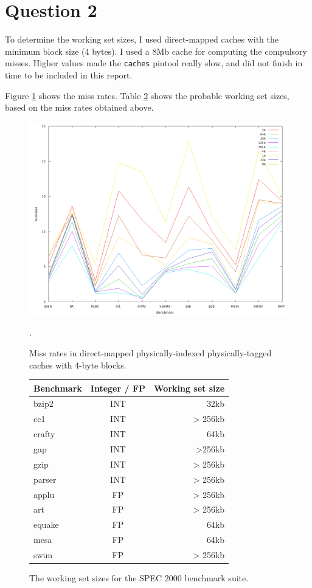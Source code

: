 \section{Question 2}
To determine the working set sizes, I used direct-mapped caches with the
minimum block size (4 bytes). I used a 8Mb cache for computing the compulsory
misses. Higher values made the \texttt{caches} pintool really slow, and did not
finish in time to be included in this report.

Figure \ref{q2:miss_rates} shows the miss rates. Table \ref{q2:working_set}
shows the probable working set sizes, based on the miss rates obtained above.

\begin{figure}[htb]
  \includegraphics[width=6.8in]{6.823/lab2/figs/working_set.png}
  \caption{Miss rates in direct-mapped physically-indexed physically-tagged
  caches with 4-byte blocks. }
  \label{q2:miss_rates}.
\end{figure}

\begin{figure}[htb]
\center

\begin{tabular}{lcr}
\hline
Benchmark & Integer / FP & Working set size \\
\hline
bzip2 & INT & 32kb \\
cc1 & INT & > 256kb \\
crafty & INT & 64kb \\
gap & INT & >256kb \\
gzip & INT & > 256kb \\
parser & INT & > 256kb \\
\hline
applu & FP & > 256kb \\
art & FP & > 256kb \\
equake & FP & 64kb \\
mesa & FP & 64kb \\
swim & FP & > 256kb \\
\hline
\end{tabular}

\caption{The working set sizes for the SPEC 2000 benchmark suite. }
\label{q2:working_set}
\end{figure}

